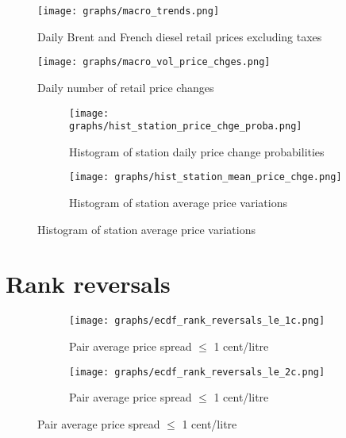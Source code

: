 \documentclass[english]{article}
\begin{document}
\newpage

\begin{figure}[!h]
    \caption{Daily Brent and French diesel retail prices excluding taxes}
	\centering
		\texttt{[image: graphs/macro\_trends.png]}
\label{fig:macro_trends}
\end{figure}

\begin{figure}[!h]
    \caption{Daily number of retail price changes}
	\centering
		\texttt{[image: graphs/macro\_vol\_price\_chges.png]}
\label{fig:macro_vol_price_chges}
\end{figure}

\begin{figure}[H]
\centering
\caption{Price changes by station)}
\begin{subfigure}{.4\linewidth}
\centering
\texttt{[image: graphs/hist\_station\_price\_chge\_proba.png]}
\caption[short]{Histogram of station daily price change probabilities}
\label{fig:hist_station_price_chge_proba}
\end{subfigure}
\begin{subfigure}{.4\linewidth}
\centering
\texttt{[image: graphs/hist\_station\_mean\_price\_chge.png]}
\caption[short]{Histogram of station average price variations}
\label{fig:hist_station_mean_price_chge}
\end{subfigure}
\end{figure}

\newpage

\section{Rank reversals}

\begin{figure}[H]
\centering
\caption{Empirical distribution functions of rank reversals (raw prices)}
\begin{subfigure}{.4\linewidth}
\centering
\texttt{[image: graphs/ecdf\_rank\_reversals\_le\_1c.png]}
\caption[short]{Pair average price spread $\le$ 1 cent/litre}
\end{subfigure}
\begin{subfigure}{.4\linewidth}
\centering
\texttt{[image: graphs/ecdf\_rank\_reversals\_le\_2c.png]}
\caption[short]{Pair average price spread $\le$ 1 cent/litre}
\end{subfigure}
\end{figure}
\end{document}
